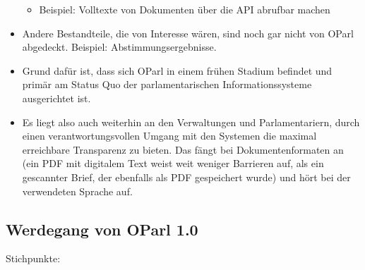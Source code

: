 \documentclass[,a4paper]{article}
\begin{document}
\begin{itemize}
  \begin{itemize}
  \itemsep1pt\parskip0pt
  \item
    Beispiel: Volltexte von Dokumenten über die API abrufbar machen
  \end{itemize}
\item
  Andere Bestandteile, die von Interesse wären, sind noch gar nicht von
  OParl abgedeckt. Beispiel: Abstimmungsergebnisse.
\item
  Grund dafür ist, dass sich OParl in einem frühen Stadium befindet und
  primär am Status Quo der parlamentarischen Informationssysteme
  ausgerichtet ist.
\item
  Es liegt also auch weiterhin an den Verwaltungen und Parlamentariern,
  durch einen verantwortungsvollen Umgang mit den Systemen die maximal
  erreichbare Transparenz zu bieten. Das fängt bei Dokumentenformaten an
  (ein PDF mit digitalem Text weist weit weniger Barrieren auf, als ein
  gescannter Brief, der ebenfalls als PDF gespeichert wurde) und hört
  bei der verwendeten Sprache auf.
\end{itemize}

\subsection{Werdegang von OParl 1.0}\label{werdegang-von-oparl-1.0}

Stichpunkte:
\end{document}
